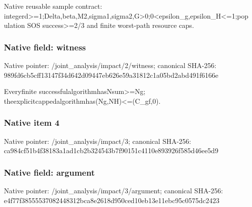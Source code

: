\documentclass[10pt,a4paper]{article}
\begin{document}
\begingroup\raggedright\sloppy Native reusable sample contract:\allowbreak{} integerd>=\allowbreak{}1;\allowbreak{}Delta,\allowbreak{}beta,\allowbreak{}M2,\allowbreak{}sigma1,\allowbreak{}sigma2,\allowbreak{}G>0;\allowbreak{}0<epsilon\_\allowbreak{}g,\allowbreak{}epsilon\_\allowbreak{}H<=\allowbreak{}1;\allowbreak{}population SOS success>=\allowbreak{}2/\allowbreak{}3 and finite worst-path resource caps.\par\endgroup

\subsubsection{Native field: witness}
Native pointer: /joint\_\allowbreak{}analysis/impact/2/witness; canonical SHA-256: 989fd6cb5cff13147f34d642d09447eb626e59a31812c1a05bd2abd491f6166e

\begingroup\raggedright\sloppy Everyfinite successfulalgorithmhasNsum>=\allowbreak{}Ng;\allowbreak{} theexplicitcappedalgorithmhas(Ng,\allowbreak{}NH)<=\allowbreak{}(C\_\allowbreak{}gf,\allowbreak{}0).\par\endgroup

\subsubsection{Native item 4}
Native pointer: /joint\_\allowbreak{}analysis/impact/3; canonical SHA-256: ca984cf51b4f38183a1ad1cb2b324543b7f90151c4110e893926f585d46ee5d9

\subsubsection{Native field: argument}
Native pointer: /joint\_\allowbreak{}analysis/impact/3/argument; canonical SHA-256: e4f77f38555537082448312bca8e2618d950ced10eb13e11ebc95c0575dc2423
\end{document}
